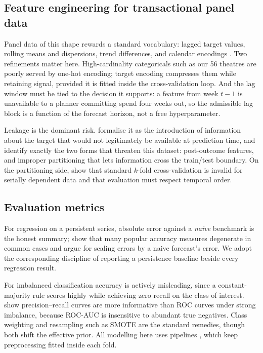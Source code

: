 \subsection{Feature engineering for transactional panel data}

Panel data of this shape rewards a standard vocabulary: lagged target values,
rolling means and dispersions, trend differences, and calendar encodings
\citep{hyndman2021fpp}. Two refinements matter here. High-cardinality
categoricals such as our 56 theatres are poorly served by one-hot encoding;
target encoding \citep{miccibarreca2001target} compresses them while retaining
signal, provided it is fitted inside the cross-validation loop. And the lag
window must be tied to the decision it supports: a feature from week $t-1$ is
unavailable to a planner committing spend four weeks out, so the admissible lag
block is a function of the forecast horizon, not a free hyperparameter.

Leakage is the dominant risk. \citet{kaufman2012leakage} formalise it as the
introduction of information about the target that would not legitimately be
available at prediction time, and identify exactly the two forms that threaten
this dataset: post-outcome features, and improper partitioning that lets
information cross the train/test boundary. On the partitioning side,
\citet{bergmeir2012cv} show that standard $k$-fold cross-validation is invalid
for serially dependent data and that evaluation must respect temporal order.

\subsection{Evaluation metrics}

For regression on a persistent series, absolute error against a \emph{naive}
benchmark is the honest summary; \citet{hyndman2006accuracy} show that many
popular accuracy measures degenerate in common cases and argue for scaling
errors by a naive forecast's error. We adopt the corresponding discipline of
reporting a persistence baseline beside every regression result.

For imbalanced classification accuracy is actively misleading, since a
constant-majority rule scores highly while achieving zero recall on the class of
interest. \citet{saito2015prplot} show precision--recall curves are more
informative than ROC curves under strong imbalance, because ROC-AUC is
insensitive to abundant true negatives. Class weighting and resampling such as
SMOTE \citep{chawla2002smote} are the standard remedies, though both shift the
effective prior. All modelling here uses  pipelines
\citep{pedregosa2011sklearn}, which keep preprocessing fitted inside each fold.

